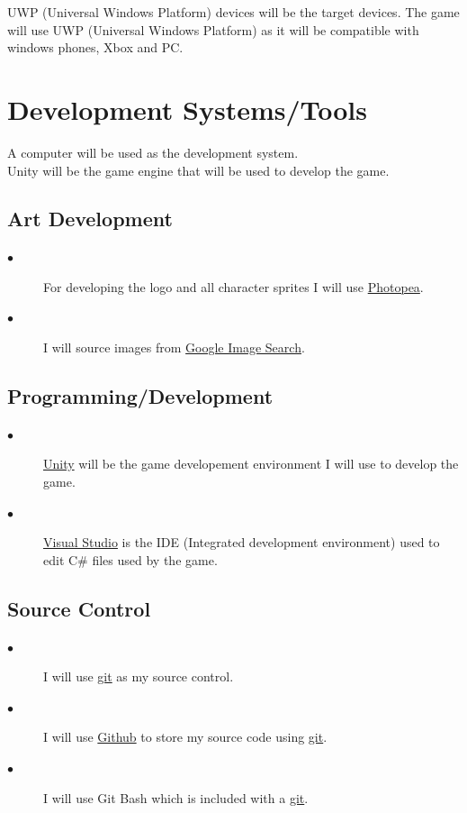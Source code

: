 \documentclass[a4paper]{scrreprt}
\begin{document}
UWP (Universal Windows Platform) devices will be the target devices. The game will use UWP (Universal Windows Platform) as it will be compatible with windows phones, Xbox and PC.

\section{Development Systems/Tools}

A computer will be used as the development system. \\
Unity will be the game engine that will be used to develop the game. \\

\subsection{Art Development}

\begin{description}
    \item[$\bullet$] For developing the logo and all character sprites I will use \href{https://www.photopea.com/}{Photopea}.
    \item[$\bullet$] I will source images from \href{https://images.google.com/}{Google Image Search}.
\end{description}

\subsection{Programming/Development}

\begin{description}
    \item[$\bullet$] \href{https://unity3d.com/}{Unity} will be the game developement environment I will use to develop the game.
    \item[$\bullet$] \href{https://visualstudio.microsoft.com/}{Visual Studio} is the IDE (Integrated development environment) used to edit C\# files used by the game.
\end{description}

\subsection{Source Control}

\begin{description}
    \item[$\bullet$] I will use \href{https://git-scm.com/}{git} as my source control.
    \item[$\bullet$] I will use \href{https://github.com}{Github} to store my source code using \href{https://git-scm.com/}{git}.
    \item[$\bullet$] I will use Git Bash which is included with a \href{https://git-scm.com/downloads}{git}.
\end{description}
\end{document}

